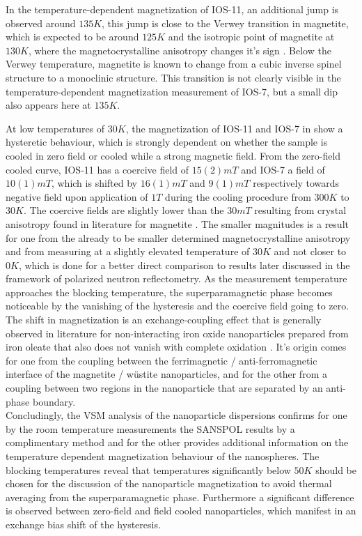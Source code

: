 \documentclass[\main/dresen_thesis.tex]{subfiles}
\begin{document}
  In the temperature-dependent magnetization of IOS-11, an additional jump is observed around $135 \unit{K}$, this jump is close to the Verwey transition in magnetite, which is expected to be around $125 \unit{K}$ \cite{Walz_2002_Theve} and the isotropic point of magnetite at $130 \unit{K}$, where the magnetocrystalline anisotropy changes it's sign \cite{Muxworthy_1999_Lowte}.
  Below the Verwey temperature, magnetite is known to change from a cubic inverse spinel structure to a monoclinic structure.
  This transition is not clearly visible in the temperature-dependent magnetization measurement of IOS-7, but a small dip also appears here at $135 \unit{K}$.

  At low temperatures of $30 \unit{K}$, the magnetization of IOS-11 and IOS-7 in  show a hysteretic behaviour, which is strongly dependent on whether the sample is cooled in zero field or cooled while a strong magnetic field.
  From the zero-field cooled curve, IOS-11 has a coercive field of $15(2) \unit{mT}$ and IOS-7 a field of $10(1) \unit{mT}$, which is shifted by $16(1) \unit{mT}$ and $9(1) \unit{mT}$ respectively towards negative field upon application of $1 \unit{T}$ during the cooling procedure from $300 \unit{K}$ to $30 \unit{K}$.
  The coercive fields are slightly lower than the $30 \unit{mT}$ resulting from crystal anisotropy found in literature for magnetite \cite{Cornell_2003_Their}.
  The smaller magnitudes is a result for one from the already to be smaller determined magnetocrystalline anisotropy and from measuring at a slightly elevated temperature of $30 \unit{K}$ and not closer to $0 \unit{K}$, which is done for a better direct comparison to results later discussed in the framework of polarized neutron reflectometry.
  As the measurement temperature approaches the blocking temperature, the superparamagnetic phase becomes noticeable by the vanishing of the hysteresis and the coercive field going to zero.
  The shift in magnetization is an exchange-coupling effect that is generally observed in literature for non-interacting iron oxide nanoparticles prepared from iron oleate that also does not vanish with complete oxidation \cite{Wetterskog_2013_Anoma}.
  It's origin comes for one from the coupling between the ferrimagnetic / anti-ferromagnetic interface of the magnetite / w\"ustite nanoparticles, and for the other from a coupling between two regions in the nanoparticle that are separated by an anti-phase boundary.
  \\

  Concludingly, the VSM analysis of the nanoparticle dispersions confirms for one by the room temperature measurements the SANSPOL results by a complimentary method and for the other provides additional information on the temperature dependent magnetization behaviour of the nanospheres.
  The blocking temperatures reveal that temperatures significantly below $50 \unit{K}$ should be chosen for the discussion of the nanoparticle magnetization to avoid thermal averaging from the superparamagnetic phase.
  Furthermore a significant difference is observed between zero-field and field cooled nanoparticles, which manifest in an exchange bias shift of the hysteresis.
\end{document}
